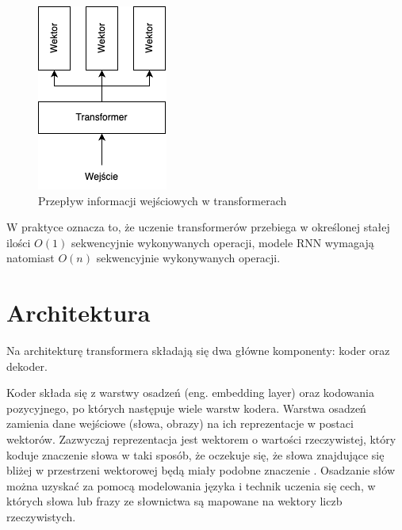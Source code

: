 \begin{figure}[H]
    \centering
	\includegraphics[scale=0.60]{figs/transformer.png}
	\caption{Przepływ informacji wejściowych w transformerach}
	\label{fig:transformer_schema}
\end{figure}

W praktyce oznacza to, że uczenie transformerów przebiega w określonej stałej ilości $O(1)$ sekwencyjnie wykonywanych operacji, modele RNN wymagają natomiast $O(n)$ sekwencyjnie wykonywanych operacji. %


\section{Architektura}

Na architekturę transformera składają się dwa główne komponenty: koder oraz dekoder. %

Koder składa się z warstwy osadzeń (eng. embedding layer) oraz kodowania pozycyjnego, po których następuje wiele warstw kodera.
Warstwa osadzeń zamienia dane wejściowe (słowa, obrazy) na ich reprezentacje w postaci wektorów.
Zazwyczaj reprezentacja jest wektorem o wartości rzeczywistej, który koduje znaczenie słowa w taki sposób, że oczekuje się, że słowa znajdujące się bliżej w przestrzeni wektorowej będą miały podobne znaczenie \cite{jm3}.
Osadzanie słów można uzyskać za pomocą modelowania języka i technik uczenia się cech, w których słowa lub frazy ze słownictwa są mapowane na wektory liczb rzeczywistych.

